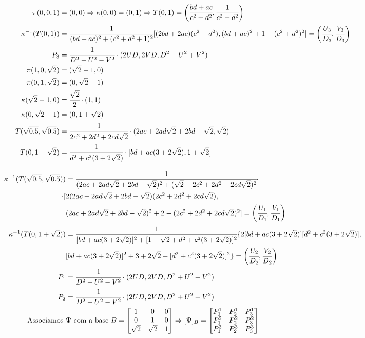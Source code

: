 \documentclass[10pt,a4paper]{article}
\begin{document}
		\begin{align*}
		\pi(0,0,1) &= (0, 0) \Rightarrow \kappa(0,0) = (0, 1) \Rightarrow T(0, 1) = \bigg( \cfrac{bd + ac}{c^2 + d^2} , \cfrac{1}{c^2 + d^2} \bigg) \\
		\kappa^{-1}(T(0,1)) &= \cfrac{1}{(bd + ac)^2 + (c^2 + d^2 + 1)^2} [ (2bd + 2ac)(c^2 + d^2), (bd + ac)^2 + 1 - (c^2 + d^2)^2 ] = \bigg( \cfrac{U_3}{D_3}, \cfrac{V_3}{D_3} \bigg) \\
		P_3 &= \cfrac{1}{D^2 - U^2 - V^2} \cdot (2UD, 2VD, D^2 + U^2 + V^2 ) \\
		\pi(1,0,\sqrt 2) &= (\sqrt 2 - 1, 0)\\
		\pi(0,1,\sqrt 2) &= (0, \sqrt 2 - 1)\\
		\kappa(\sqrt 2 - 1, 0) &= \cfrac{\sqrt 2}{2} \cdot (1,1)\\
		\kappa(0, \sqrt 2 - 1) &= (0, 1 + \sqrt 2)\\
		T(\sqrt{0.5}, \sqrt{0.5}) &= \cfrac{1}{2c^2 + 2d^2 + 2cd\sqrt 2} \cdot (2ac + 2ad\sqrt 2 + 2bd - \sqrt 2, \sqrt 2)\\
		T(0, 1 + \sqrt 2) &= \cfrac{1}{d^2 + c^2 (3 + 2\sqrt 2)} \cdot [ bd + ac(3 + 2\sqrt 2) , 1 + \sqrt 2]
		\end{align*}

		\begin{align*}
		\kappa^{-1}(T(\sqrt{0.5}, \sqrt{0.5})) &= \cfrac{1}{(2ac + 2ad\sqrt 2 + 2bd - \sqrt 2)^2 + (\sqrt 2 + 2c^2 + 2d^2 + 2cd\sqrt 2)^2} \cdot \\
		\cdot [ &2(2ac + 2ad\sqrt 2 + 2bd - \sqrt 2)(2c^2 + 2d^2 + 2cd\sqrt 2), \\
		&(2ac + 2ad\sqrt 2 + 2bd - \sqrt 2)^2 + 2 - (2c^2 + 2d^2 + 2cd\sqrt 2)^2 ] = \bigg( \cfrac{U_1}{D_1}, \cfrac{V_1}{D_1} \bigg) \\
		\kappa^{-1}(T(0, 1 + \sqrt 2)) &= \cfrac{1}{[bd + ac(3 + 2\sqrt 2)]^2 + [1 + \sqrt 2 + d^2 + c^2 (3 + 2\sqrt 2)]^2} \{ 2[bd + ac(3 + 2\sqrt 2)][d^2 + c^2 (3 + 2\sqrt 2)], \\
		&[bd + ac(3 + 2\sqrt 2)]^2 + 3 + 2 \sqrt 2 - [d^2 + c^2 (3 + 2\sqrt 2)]^2 \} = \bigg( \cfrac{U_2}{D_2}, \cfrac{V_2}{D_2} \bigg) \\
		P_1 &= \cfrac{1}{D^2 - U^2 - V^2} \cdot (2UD, 2VD, D^2 + U^2 + V^2 ) \\
		P_2 &= \cfrac{1}{D^2 - U^2 - V^2} \cdot (2UD, 2VD, D^2 + U^2 + V^2 ) \\
		\text{Associamos }&\Psi\text{ com a base }B = \left[ \begin{matrix} 1 & 0 & 0 \\ 0 & 1 & 0 \\ \sqrt 2 & \sqrt 2 & 1 \end{matrix} \right] \Rightarrow [\Psi]_B = \left[ \begin{matrix} P_1^1 & P_2^1 & P_3^1 \\ P_1^2 & P_2^2 & P_3^2 \\ P_1^3 & P_2^3 & P_3^3 \end{matrix} \right]
		\end{align*}
\end{document}
